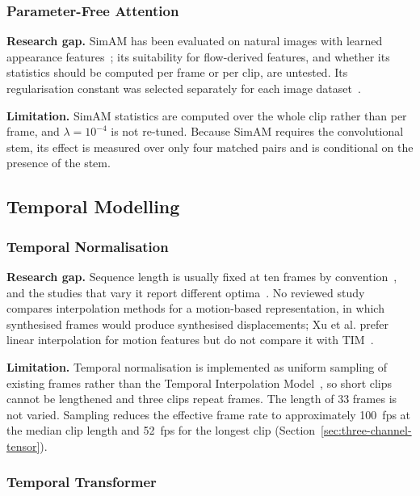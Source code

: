\subsubsection{Parameter-Free Attention}

\textbf{Research gap.} SimAM has been evaluated on natural images with learned appearance features~\cite{yang2021}; its suitability for flow-derived features, and whether its statistics should be computed per frame or per clip, are untested. Its regularisation constant was selected separately for each image dataset~\cite{yang2021}.

\textbf{Limitation.} SimAM statistics are computed over the whole clip rather than per frame, and $\lambda = 10^{-4}$ is not re-tuned. Because SimAM requires the convolutional stem, its effect is measured over only four matched pairs and is conditional on the presence of the stem.

\subsection{Temporal Modelling}
\label{sec:gaps-temporal}

\subsubsection{Temporal Normalisation}

\textbf{Research gap.} Sequence length is usually fixed at ten frames by convention~\cite{liX2013,lu2015}, and the studies that vary it report different optima~\cite{liX2018,ben2021,xu2017}. No reviewed study compares interpolation methods for a motion-based representation, in which synthesised frames would produce synthesised displacements; Xu et al. prefer linear interpolation for motion features but do not compare it with TIM~\cite{xu2017}.

\textbf{Limitation.} Temporal normalisation is implemented as uniform sampling of existing frames rather than the Temporal Interpolation Model~\cite{pfister2011}, so short clips cannot be lengthened and three clips repeat frames. The length of 33 frames is not varied. Sampling reduces the effective frame rate to approximately 100~fps at the median clip length and 52~fps for the longest clip (Section~\ref{sec:three-channel-tensor}).

\subsubsection{Temporal Transformer}

